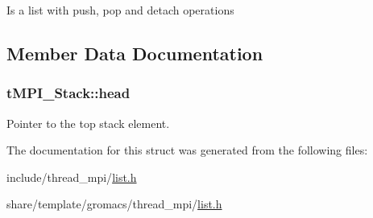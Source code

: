 \-Is a list with push, pop and detach operations 

\subsection{\-Member \-Data \-Documentation}
\hypertarget{structtMPI__Stack_a52e3462e96943008d246882671daab83}{
\subsubsection[{head}]{ {\bf t\-M\-P\-I\-\_\-\-Stack\-::head}}}\label{structtMPI__Stack_a52e3462e96943008d246882671daab83}
\-Pointer to the top stack element. 

\-The documentation for this struct was generated from the following files\-:\begin{DoxyCompactItemize}
\item 
include/thread\-\_\-mpi/\hyperlink{include_2thread__mpi_2list_8h}{list.\-h}\item 
share/template/gromacs/thread\-\_\-mpi/\hyperlink{share_2template_2gromacs_2thread__mpi_2list_8h}{list.\-h}\end{DoxyCompactItemize}
